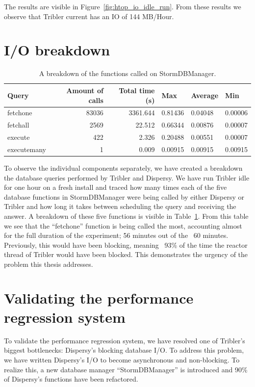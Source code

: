 The results are visible in Figure~\ref{fig:htop_io_idle_run}. 
From these results we observe that Tribler current has an IO of 144 MB/Hour.

\section{I/O breakdown}

\begin{table}[]
	\centering
	\caption{A breakdown of the functions called on StormDBManager.}
	\label{table:breakdown_tribler_idle}
	\begin{tabular}{|l|r|r|l|l|l|}
		\hline
	\textbf{Query}	& \textbf{Amount of calls} & \textbf{Total time (s)} & \textbf{Max}  & \textbf{Average} & \textbf{Min} \\ \hline
	fetchone	& 83036	& 3361.644 	& 0.81436	& 0.04048	& 0.00006 \\ \hline
	fetchall	& 2569	& 22.512	& 0.66344	& 0.00876	& 0.00007 \\ \hline
	execute		& 422	& 2.326  	& 0.20488	& 0.00551	& 0.00007 \\ \hline
	executemany	& 1		& 0.009 	& 0.00915 	& 0.00915	& 0.00915 \\ \hline
	\end{tabular}
\end{table}

To observe the individual components separately, we have created a breakdown the database queries performed by Tribler and Dispersy.
We have run Tribler idle for one hour on a fresh install and traced how many times each of the five database functions in StormDBManager were being called by either Dispersy or Tribler and how long it takes between scheduling the query and receiving the answer.
A breakdown of these five functions is visible in Table~\ref{table:breakdown_tribler_idle}.
From this table we see that the \enquote{fetchone} function is being called the most, accounting almost for the full duration of the experiment; 56 minutes out of the ~60 minutes.
Previously, this would have been blocking, meaning ~93\% of the time the reactor thread of Tribler would have been blocked.
This demonstrates the urgency of the problem this thesis addresses. 

\section{Validating the performance regression system}

To validate the performance regression system, we have resolved one of Tribler's biggest bottlenecks: Dispersy's blocking database I/O.
To address this problem, we have written Dispersy's I/O to become asynchronous and non-blocking.
To realize this, a new database manager \enquote{StormDBManager} is introduced and 90\% of Dispersy's functions have been refactored.

